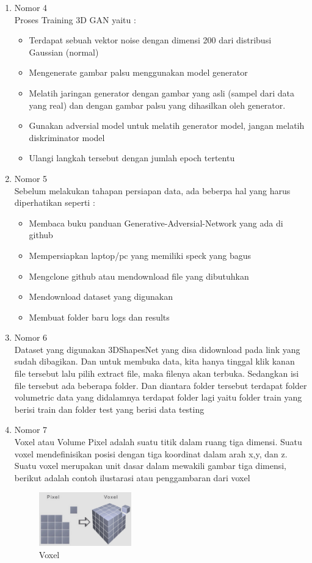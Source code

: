 \begin{enumerate}
\item Nomor 4\\
Proses Training 3D GAN yaitu :
\begin{itemize}
\item Terdapat sebuah vektor noise dengan dimensi 200 dari distribusi Gaussian (normal)
\item Mengenerate gambar palsu menggunakan model generator
\item Melatih jaringan generator dengan gambar yang asli (sampel dari data yang real) dan dengan gambar palsu yang dihasilkan oleh generator.
\item Gunakan adversial model untuk melatih generator model, jangan melatih diskriminator model
\item Ulangi langkah tersebut dengan jumlah epoch tertentu
\end{itemize}

\item Nomor 5\\
Sebelum melakukan tahapan persiapan data, ada beberpa hal yang harus diperhatikan seperti :
\begin{itemize}
\item Membaca buku panduan Generative-Adversial-Network yang ada di github
\item Mempersiapkan laptop/pc yang memiliki speck yang bagus
\item Mengclone github atau mendownload file yang dibutuhkan
\item Mendownload dataset yang digunakan
\item Membuat folder baru logs dan results
\end{itemize}

\item Nomor 6\\
Dataset yang digunakan 3DShapesNet yang disa didownload pada link yang sudah dibagikan. Dan untuk membuka data, kita hanya tinggal klik kanan file tersebut lalu pilih extract file, maka filenya akan terbuka. Sedangkan isi file tersebut ada beberapa folder. Dan diantara folder tersebut terdapat folder volumetric data yang didalamnya terdapat folder lagi yaitu folder train yang berisi train dan folder test yang berisi data testing

\item Nomor 7\\
Voxel atau Volume Pixel adalah suatu titik dalam ruang tiga dimensi. Suatu voxel mendefinisikan posisi dengan tiga koordinat dalam arah x,y, dan z. Suatu voxel merupakan unit dasar dalam mewakili gambar tiga dimensi, berikut adalah contoh ilustarasi atau penggambaran dari voxel
\begin{figure}[H]
	\includegraphics[width=4cm]{figures/1174054/8/8.png}
	\centering
	\caption{Voxel}
\end{figure}


\end{enumerate}
